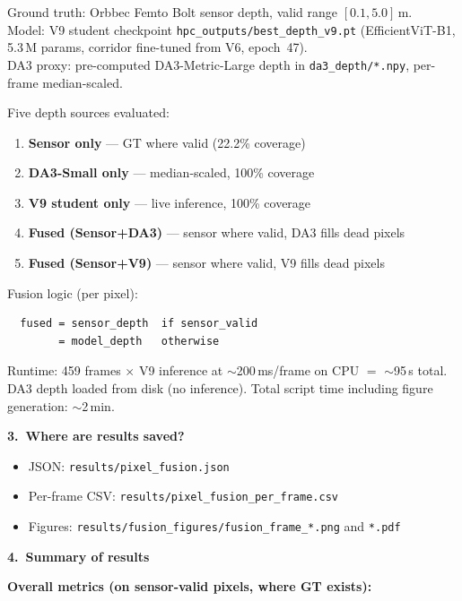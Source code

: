 \documentclass[11pt,a4paper]{article}
\begin{document}
Ground truth: Orbbec Femto Bolt sensor depth, valid range
$[0.1, 5.0]$\,m.\\
Model: V9 student checkpoint
\texttt{hpc\_outputs/best\_depth\_v9.pt} (EfficientViT-B1, 5.3\,M
params, corridor fine-tuned from V6, epoch~47).\\
DA3 proxy: pre-computed DA3-Metric-Large depth in
\texttt{da3\_depth/*.npy}, per-frame median-scaled.

Five depth sources evaluated:
\begin{enumerate}
  \item \textbf{Sensor only} --- GT where valid (22.2\% coverage)
  \item \textbf{DA3-Small only} --- median-scaled, 100\% coverage
  \item \textbf{V9 student only} --- live inference, 100\% coverage
  \item \textbf{Fused (Sensor+DA3)} --- sensor where valid, DA3 fills
    dead pixels
  \item \textbf{Fused (Sensor+V9)} --- sensor where valid, V9 fills
    dead pixels
\end{enumerate}

Fusion logic (per pixel):
\begin{verbatim}
  fused = sensor_depth  if sensor_valid
        = model_depth   otherwise
\end{verbatim}

Runtime: 459 frames $\times$ V9 inference at $\sim$200\,ms/frame on
CPU $=$ $\sim$95\,s total.  DA3 depth loaded from disk (no inference).
Total script time including figure generation: $\sim$2\,min.

\textbf{3.\ Where are results saved?}

\begin{itemize}
  \item JSON: \texttt{results/pixel\_fusion.json}
  \item Per-frame CSV: \texttt{results/pixel\_fusion\_per\_frame.csv}
  \item Figures: \texttt{results/fusion\_figures/fusion\_frame\_*.png}
    and \texttt{*.pdf}
\end{itemize}

\textbf{4.\ Summary of results}

\textbf{Overall metrics (on sensor-valid pixels, where GT exists):}
\end{document}
